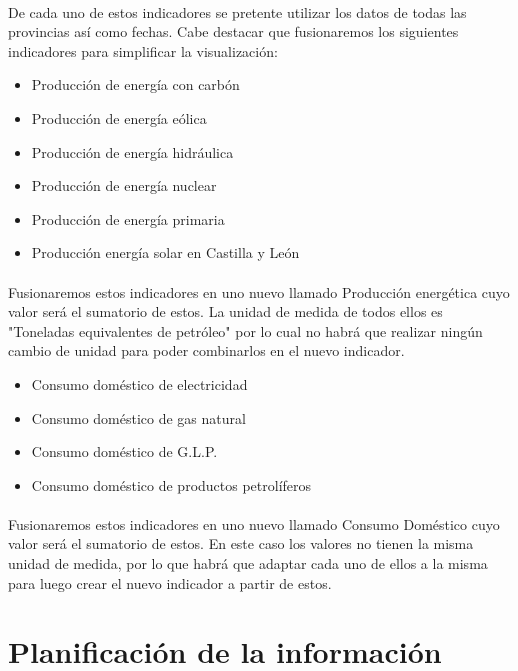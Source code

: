 \documentclass{article}
\begin{document}
			\paragraph{}
			De cada uno de estos indicadores se pretente utilizar los datos de todas las provincias así como fechas. Cabe destacar que fusionaremos los siguientes indicadores para simplificar la visualización:
			\begin{itemize}
				\item Producción de energía con carbón
				\item Producción de energía eólica
				\item Producción de energía hidráulica
				\item Producción de energía nuclear
				\item Producción de energía primaria
				\item Producción energía solar en Castilla y León
			\end{itemize}
			
			\paragraph{}
			Fusionaremos estos indicadores en uno nuevo llamado Producción energética cuyo valor será el sumatorio de estos. La unidad de medida de todos ellos es "Toneladas equivalentes de petróleo" por lo cual no habrá que realizar ningún cambio de unidad para poder combinarlos en el nuevo indicador.
			
			\begin{itemize}
				\item Consumo doméstico de electricidad
				\item Consumo doméstico de gas natural
				\item Consumo doméstico de G.L.P.
				\item Consumo doméstico de productos petrolíferos
			\end{itemize}
			
			\paragraph{}
			Fusionaremos estos indicadores en uno nuevo llamado Consumo Doméstico cuyo valor será el sumatorio de estos. En este caso los valores no tienen la misma unidad de medida, por lo que habrá que adaptar cada uno de ellos a la misma para luego crear el nuevo indicador a partir de estos.
			

	\section{Planificación de la información}
\end{document}
